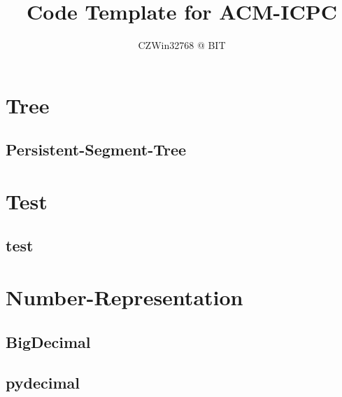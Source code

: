 \documentclass{article}
\title{Code Template for ACM-ICPC}
\author{CZWin32768 @ BIT}
\begin{document}
\begin{titlepage}
\maketitle
\thispagestyle{empty}
\pagebreak
\pagestyle{plain}
\tableofcontents
\end{titlepage}
  
\section{Tree}
\subsection{Persistent-Segment-Tree}

\section{Test}
\subsection{test}

\section{Number-Representation}
\subsection{BigDecimal}

\subsection{pydecimal}

\end{document}
